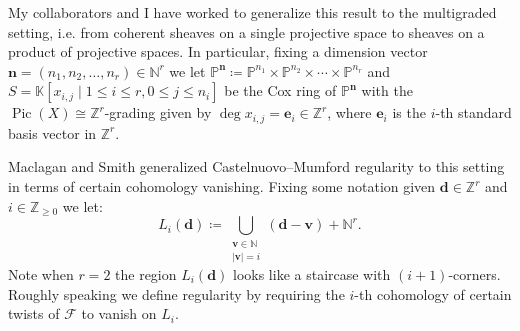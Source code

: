 \documentclass[11pt,reqno]{amsart}
\theoremstyle{remark}
\newcommand{\Pic}{\operatorname{Pic}}
\newcommand{\dd}{\mathbf d}
\newcommand{\ee}{\mathbf e}
\newcommand{\vv}{\mathbf v}
\newcommand{\nn}{\mathbf n}
\newcommand{\cF}{\mathcal{F}}
\newcommand{\K}{\mathbb{K}}
\newcommand{\N}{\mathbb{N}}
\renewcommand{\P}{\mathbb{P}}
\newcommand{\Z}{\mathbb{Z}}
\begin{document}
My collaborators and I have worked to generalize this result to the multigraded setting, i.e. from coherent sheaves on a single projective space to sheaves on a product of projective spaces. In particular, fixing a dimension vector $\nn=(n_1,n_2,\ldots,n_{r})\in \N^{r}$ we let $\P^{\nn}\coloneqq \P^{n_1}\times \P^{n_2}\times \cdots \times \P^{n_r}$ and $S=\K[x_{i,j} \; |\; 1\leq i \leq r, 0\leq j \leq n_{i}]$ be the Cox ring of $\P^{\nn}$ with the $\Pic(X)\cong \Z^{r}$-grading given by $\deg x_{i,j} = \ee_{i} \in \Z^{r}$, where $\ee_{i}$ is the $i$-th standard basis vector in $\Z^{r}$. 

Maclagan and Smith generalized Castelnuovo--Mumford regularity to this setting in terms of certain cohomology vanishing. Fixing some notation given $\dd\in \Z^{r}$ and $i\in \Z_{\geq0}$ we let:
\[
L_{i}(\dd)\coloneqq \bigcup_{\substack{\vv \in \N \\ |\vv| = i}} (\dd-\vv)+\N^{r}.
\]
Note when $r=2$ the region $L_{i}(\dd)$ looks like a staircase with $(i+1)$-corners. Roughly speaking we define regularity by requiring the $i$-th cohomology of certain twists of $\cF$ to vanish on $L_{i}$. 
\end{document}
